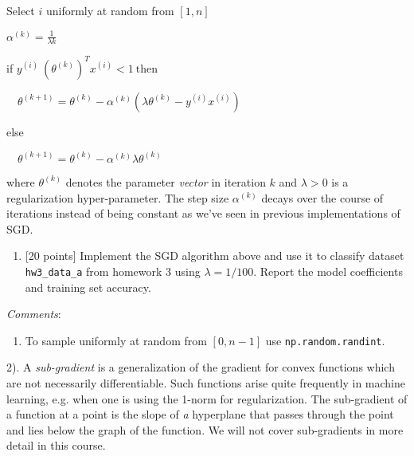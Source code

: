 \documentclass[11pt]{article}
\providecommand{\tightlist}{%
      \setlength{\itemsep}{0pt}\setlength{\parskip}{0pt}}
\begin{document}
Select \(i\) uniformly at random from \([1,n]\)

\(\alpha^{(k)} = \frac{1}{\lambda k}\)

if \(y^{(i)}~(\theta^{(k)})^T x^{(i)} < 1 ~\textrm{then}\)

\(\quad \theta^{(k+1)} = \theta^{(k)} - \alpha^{(k)}(\lambda \theta^{(k)} - y^{(i)} x^{(i)})\)

else

\(\quad \theta^{(k+1)} = \theta^{(k)} - \alpha^{(k)} \lambda \theta^{(k)}\)

where \(\theta^{(k)}\) denotes the parameter \emph{vector} in iteration
\(k\) and \(\lambda>0\) is a regularization hyper-parameter. The step
size \(\alpha^{(k)}\) decays over the course of iterations instead of
being constant as we've seen in previous implementations of SGD.

\begin{enumerate}
\def\labelenumi{\alph{enumi})}
\tightlist
\item
  {[}20 points{]} Implement the SGD algorithm above and use it to
  classify dataset \texttt{hw3\_data\_a} from homework 3 using
  \(\lambda=1/100\). Report the model coefficients and training set
  accuracy.
\end{enumerate}

\emph{Comments}:

\begin{enumerate}
\def\labelenumi{\arabic{enumi})}
\tightlist
\item
  To sample uniformly at random from \([0,n-1]\) use
  \texttt{np.random.randint}.
\end{enumerate}

2). A \emph{sub-gradient} is a generalization of the gradient for convex
functions which are not necessarily differentiable. Such functions arise
quite frequently in machine learning, e.g. when one is using the 1-norm
for regularization. The sub-gradient of a function at a point is the
slope of \emph{a} hyperplane that passes through the point and lies
below the graph of the function. We will not cover sub-gradients in more
detail in this course.
\end{document}
